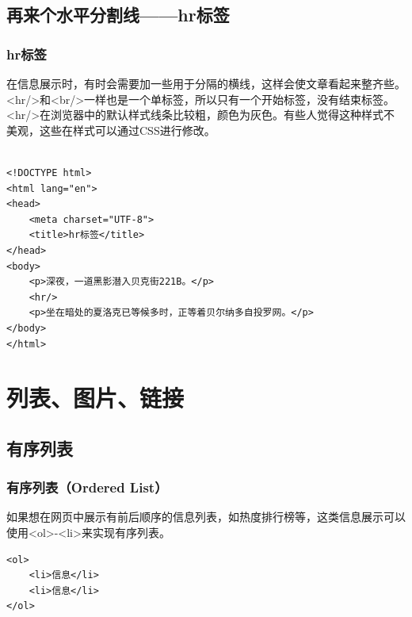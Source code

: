 \newpage

\section{再来个水平分割线——hr标签}

\subsection{hr标签}

在信息展示时，有时会需要加一些用于分隔的横线，这样会使文章看起来整齐些。\\

<hr/>和<br/>一样也是一个单标签，所以只有一个开始标签，没有结束标签。\\

<hr/>在浏览器中的默认样式线条比较粗，颜色为灰色。有些人觉得这种样式不美观，这些在样式可以通过CSS进行修改。\\

\\

\begin{lstlisting}[style=htmlcssjs]
<!DOCTYPE html>
<html lang="en">
<head>
    <meta charset="UTF-8">
    <title>hr标签</title>
</head>
<body>
    <p>深夜，一道黑影潜入贝克街221B。</p>
    <hr/>
    <p>坐在暗处的夏洛克已等候多时，正等着贝尔纳多自投罗网。</p>
</body>
</html>
\end{lstlisting}

\newpage

\chapter{列表、图片、链接}

\section{有序列表}

\subsection{有序列表（Ordered List）}

如果想在网页中展示有前后顺序的信息列表，如热度排行榜等，这类信息展示可以使用<ol>-<li>来实现有序列表。\\

\begin{lstlisting}[style=htmlcssjs]
<ol>
    <li>信息</li>
    <li>信息</li>
</ol>
\end{lstlisting}

